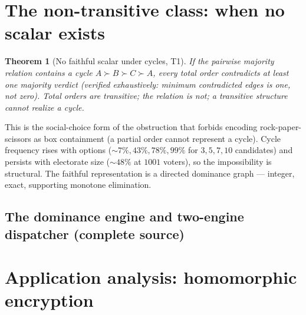 \documentclass[11pt]{article}
\newtheorem{theorem}{Theorem}[section]
\begin{document}
\section{The non-transitive class: when no scalar exists}

\begin{theorem}[No faithful scalar under cycles, T1]
If the pairwise majority relation contains a cycle $A\succ B\succ C\succ A$, every total order contradicts at
least one majority verdict (verified exhaustively: minimum contradicted edges is one, not zero). Total orders
are transitive; the relation is not; a transitive structure cannot realize a cycle.
\end{theorem}

This is the social-choice form of the obstruction that forbids encoding rock-paper-scissors as box
containment (a partial order cannot represent a cycle). Cycle frequency rises with options
($\sim\!7\%,43\%,78\%,99\%$ for $3,5,7,10$ candidates) and persists with electorate size ($\sim\!48\%$ at
$1001$ voters), so the impossibility is structural. The faithful representation is a directed dominance graph
--- integer, exact, supporting monotone elimination.

\subsection{The dominance engine and two-engine dispatcher (complete source)}


\section{Application analysis: homomorphic encryption}\label{sec:fhe}
\end{document}
